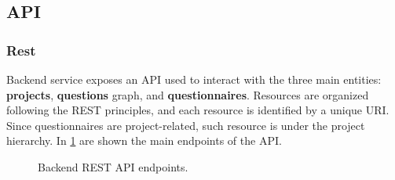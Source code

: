 \documentclass[12pt,a4paper,openright,twoside]{book}
\begin{document}
\subsection{\acs{API}}

\subsubsection{Rest}

Backend service exposes an \ac{API} used to interact with the three main entities: \textbf{projects}, \textbf{questions} graph, and \textbf{questionnaires}.
%
Resources are organized following the REST principles, and each resource is identified by a unique URI.
%
Since questionnaires are project-related, such resource is under the project hierarchy.
%
In \cref{fig:rest-api} are shown the main endpoints of the \ac{API}.


\begin{figure}
    \centering
    \hfill
    \hfill
    
    \caption{Backend REST \ac{API} endpoints.}
    \label{fig:rest-api}
\end{figure}
\end{document}
